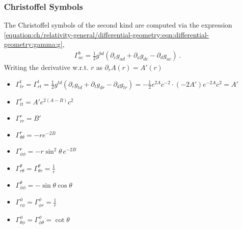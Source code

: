 \documentclass[letterpaper,10pt,english]{jupyterBook}
\begin{document}
\subsubsection{Christoffel Symbols}
\label{\detokenize{ch/relativity-general/schwarzschild-metric:christoffel-symbols}}
\sphinxAtStartPar
The Christoffel symbols of the second kind are computed via the expression \eqref{equation:ch/relativity-general/differential-geometry:eqn:differential-geometry:gamma:g},
\begin{equation*}
\begin{split}\Gamma_{ac}^{b} = \frac{1}{2} g^{bd} \left( \partial_c g_{ad} + \partial_a g_{dc} - \partial_{d} g_{ac} \right) \ .\end{split}
\end{equation*}
\sphinxAtStartPar
Writing the derivative w.r.t. \(r\) as \(\partial_r A(r) = A'(r)\)
\begin{itemize}
\item {} 
\sphinxAtStartPar
\(\Gamma^t_{tr} = \Gamma^t_{rt} = \frac{1}{2} g^{t d} \left( \partial_r g_{t d} + \partial_t g_{dr} - \partial_d g_{tr}  \right) = - \frac{1}{2} e^{2 A} c^{-2} \cdot ( - 2 A' ) e^{-2A} c^2 = A'\)

\item {} 
\sphinxAtStartPar
\(\Gamma^r_{tt} = A' e^{2(A-B)} c^2\)

\item {} 
\sphinxAtStartPar
\(\Gamma^r_{rr} = B'\)

\item {} 
\sphinxAtStartPar
\(\Gamma^r_{\theta \theta} = -r e^{-2B}\)

\item {} 
\sphinxAtStartPar
\(\Gamma^r_{\phi\phi} = -r \sin^2  \theta \, e^{-2B}\)

\item {} 
\sphinxAtStartPar
\(\Gamma^\theta_{r \theta} = \Gamma^\theta_{\theta r} = \frac{1}{r}\)

\item {} 
\sphinxAtStartPar
\(\Gamma^\theta_{\phi\phi} = -\sin\theta\cos \theta\)

\item {} 
\sphinxAtStartPar
\(\Gamma^\phi_{r\phi} = \Gamma^\phi_{\phi r} = \frac{1}{r}\)

\item {} 
\sphinxAtStartPar
\(\Gamma^\phi_{\theta\phi} = \Gamma^\phi_{\phi\theta} = \cot \theta\)

\end{itemize}
\end{document}
